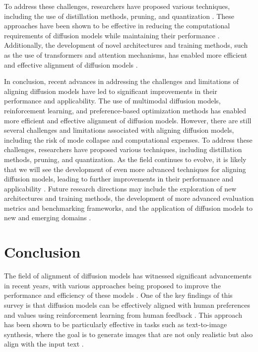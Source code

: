 \documentclass[11pt,a4paper]{article}
\begin{document}
To address these challenges, researchers have proposed various techniques, including the use of distillation methods, pruning, and quantization \cite{arxiv:2404.18928}. These approaches have been shown to be effective in reducing the computational requirements of diffusion models while maintaining their performance \cite{arxiv:2303.07576}. Additionally, the development of novel architectures and training methods, such as the use of transformers and attention mechanisms, has enabled more efficient and effective alignment of diffusion models \cite{arxiv:2211.06235}.

In conclusion, recent advances in addressing the challenges and limitations of aligning diffusion models have led to significant improvements in their performance and applicability. The use of multimodal diffusion models, reinforcement learning, and preference-based optimization methods has enabled more efficient and effective alignment of diffusion models. However, there are still several challenges and limitations associated with aligning diffusion models, including the risk of mode collapse and computational expenses. To address these challenges, researchers have proposed various techniques, including distillation methods, pruning, and quantization. As the field continues to evolve, it is likely that we will see the development of even more advanced techniques for aligning diffusion models, leading to further improvements in their performance and applicability \cite{doi:10.1109/cvpr52734.2025.02198}. Future research directions may include the exploration of new architectures and training methods, the development of more advanced evaluation metrics and benchmarking frameworks, and the application of diffusion models to new and emerging domains \cite{arxiv:2503.14504}.


\section{Conclusion}


The field of alignment of diffusion models has witnessed significant advancements in recent years, with various approaches being proposed to improve the performance and efficiency of these models \cite{doi:10.1109/tpami.2023.3261988}. One of the key findings of this survey is that diffusion models can be effectively aligned with human preferences and values using reinforcement learning from human feedback \cite{arxiv:2305.13301}. This approach has been shown to be particularly effective in tasks such as text-to-image synthesis, where the goal is to generate images that are not only realistic but also align with the input text \cite{arxiv:2305.13655}.
\end{document}
